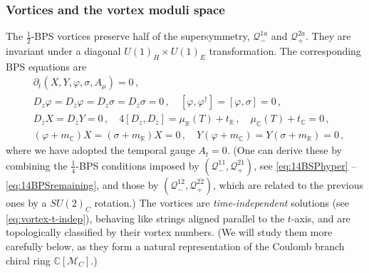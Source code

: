 \documentclass[12pt,a4paper]{article}
\renewcommand{\(}{\left(}
\renewcommand{\)}{\right)}
\renewcommand{\(}{\left(}
\renewcommand{\)}{\right)}
\begin{document}
\subsubsection{Vortices and the vortex moduli space}\label{sssec:vortex_moduli}

The $\frac{1}{2}$-BPS vortices preserve half of the supersymmetry, $\mathcal{Q}^{1\dot{a}}_{-}$ and $\mathcal{Q}^{2\dot{a}}_{+}$. 
They are invariant under a diagonal $U(1)_H\times U(1)_E$ transformation.
The corresponding BPS equations are
\begin{align}
&\partial_t(X,Y,\varphi,\sigma,A_\mu)=0\,,\quad \label{eq:vortex-t-indep}\\
&D_z\varphi=D_{\bar{z}}\varphi=D_z\sigma=D_{\bar{z}}\sigma=0\,,\quad [\varphi,\varphi^\dagger]=[\varphi,\sigma]=0\,,\label{eq:vortex_constant}\\
&D_{\bar{z}}X=D_{\bar{z}}Y=0\,,\quad 4[D_z,D_{\bar{z}}]=\mu_{\mathbb{R}}(T)+t_{\mathbb{R}}\,,\quad \mu_{\mathbb{C}}(T)+t_{\mathbb{C}}
=0\,,\label{eq:vortex_moduli}\\
&(\varphi+m_{\mathbb{C}})X=(\sigma+m_{\mathbb{R}}) X=0\,, \quad Y(\varphi+m_{\mathbb{C}})=Y(\sigma+m_{\mathbb{R}}) =0\,,\label{eq:vortex_constraint}
\end{align}
\noindent where we have adopted the temporal gauge $A_t=0$. 
(One can derive these by combining the $\frac{1}{4}$-BPS conditions imposed by $(\mathcal{Q}^{1\dot{1}}_{-}, \mathcal{Q}^{2\dot{1}}_{+})$, see \eqref{eq:14BSPhyper} -- \eqref{eq:14BPSremaining}, and those by $(\mathcal{Q}^{1\dot{2}}_{-}, \mathcal{Q}^{2\dot{2}}_{+})$, which are related to the previous ones by a $SU(2)_C$ rotation.)
The vortices are \textit{time-independent} solutions (see \eqref{eq:vortex-t-indep}), behaving like strings aligned parallel to the $t$-axis, and are topologically classified by their vortex numbers. 
(We will study them more carefully below, as they form a natural representation of the Coulomb branch chiral ring $\mathbb{C}[\mathcal{M}_C]$.)

\medskip
\end{document}
